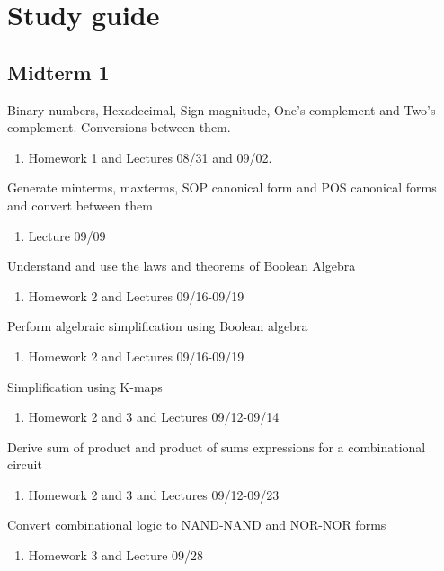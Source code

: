 \documentclass[options]{article}
\newcommand{\cmark}{\ding{51}}%
\newcommand{\done}{\rlap{$\square$}{\raisebox{2pt}{\large\hspace{1pt}\cmark}}%
  \hspace{-2.5pt}}
\begin{document}
\section{Study guide}
\subsection{Midterm 1}
\begin{todolist}
  \item[\done] Binary numbers, Hexadecimal, Sign-magnitude, One's-complement and
    Two's complement. Conversions between them.
    \begin{enumerate}
      \item Homework 1 and Lectures 08/31 and 09/02.
    \end{enumerate}
  \item[\done] Generate minterms, maxterms, SOP canonical form and POS
    canonical forms and convert between them\\
  \begin{enumerate}
    \item Lecture 09/09
  \end{enumerate}
  \item[\done]  Understand and use the laws and theorems of Boolean Algebra
  \begin{enumerate}
    \item Homework 2 and Lectures 09/16-09/19
  \end{enumerate}
  \item[\done]  Perform algebraic simplification using Boolean algebra
  \begin{enumerate}
    \item Homework 2 and Lectures 09/16-09/19
  \end{enumerate}
  \item[\done]  Simplification using K-maps
    \begin{enumerate}
    \item Homework 2 and 3 and Lectures 09/12-09/14
    \end{enumerate}
  \item[\done]  Derive sum of product and product of sums expressions for a combinational circuit
    \begin{enumerate}
    \item Homework 2 and 3 and Lectures 09/12-09/23
    \end{enumerate}
  \item[\done]  Convert combinational logic to NAND-NAND and NOR-NOR forms
    \begin{enumerate}
    \item Homework 3 and Lecture 09/28
    \end{enumerate}
\end{todolist}
\end{document}
